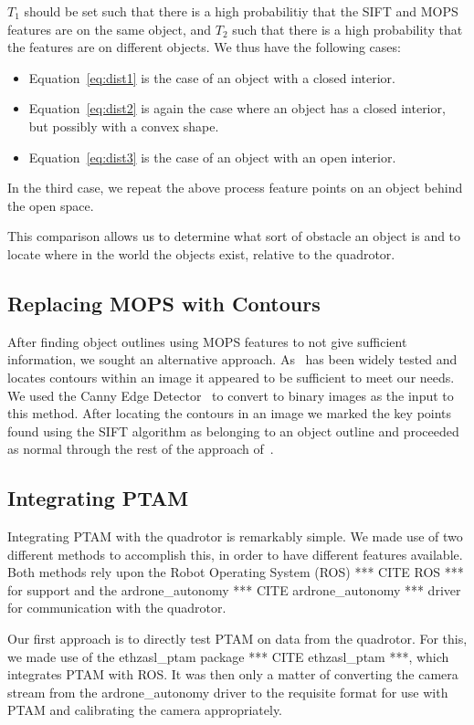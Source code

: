 \documentclass{acmsiggraph}
\begin{document}
$T_1$ should be set such that there is a high probabilitiy that the SIFT and MOPS features are on the same object, and $T_2$ such that there is a high probability that the features are on different objects. We thus have the following cases:
\begin{itemize}
\item Equation~\ref{eq:dist1} is the case of an object with a closed interior.
\item Equation~\ref{eq:dist2} is again the case where an object has a closed interior, but possibly with a convex shape.
\item Equation~\ref{eq:dist3} is the case of an object with an open interior.
\end{itemize}
In the third case, we repeat the above process feature points on an object behind the open space.

This comparison allows us to determine what sort of obstacle an object is and to locate where in the world the objects exist, relative to the quadrotor.

\subsection{Replacing MOPS with Contours}
After finding object outlines using MOPS features to not give sufficient information, we sought an 
alternative approach.  As~\cite{suzuki1985} has been widely tested and locates contours within an image it appeared to be 
sufficient to meet our needs. We used the Canny Edge Detector~\cite{canny1986} to convert to binary images as the input to
this method.  After locating the contours in an image we marked the key points found using the SIFT algorithm as 
belonging to an object outline and proceeded as normal through the rest of the approach of~\cite{lee2011}.

\subsection{Integrating PTAM}
Integrating PTAM with the quadrotor is remarkably simple. We made use of two different methods to accomplish this, in order to have different features available. Both methods rely upon the Robot Operating System (ROS) *** CITE ROS *** for support and the ardrone\_autonomy *** CITE ardrone\_autonomy *** driver for communication with the quadrotor.

Our first approach is to directly test PTAM on data from the quadrotor. For this, we made use of the ethzasl\_ptam package *** CITE ethzasl\_ptam ***, which integrates PTAM with ROS. It was then only a matter of converting the camera stream from the ardrone\_autonomy driver to the requisite format for use with PTAM and calibrating the camera appropriately.
\end{document}
